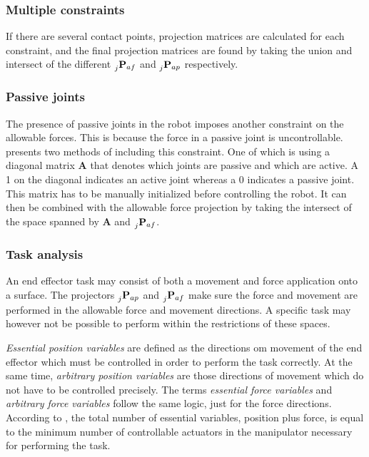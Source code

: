\subsubsection{Multiple constraints}\label{subseq:mult_contacts}

If there are several contact points, projection matrices are calculated for each constraint, and the final projection matrices are found by taking the union and intersect of the different $\prescript{}{j}{\mathbf{P}}_{af}$ and $\prescript{}{j}{\mathbf{P}}_{ap}$ respectively.

\subsubsection{Passive joints}

The presence of passive joints in the robot imposes another constraint on the allowable forces. This is because the force in a passive joint is uncontrollable. \cite{west1985method} presents two methods of including this constraint. One of which is using a diagonal matrix $\mathbf{A}$ that denotes which joints are passive and which are active. A 1 on the diagonal indicates an active joint whereas a 0 indicates a passive joint. This matrix has to be manually initialized before controlling the robot. It can then be combined with the allowable force projection by taking the intersect of the space spanned by $\mathbf{A}$ and $\prescript{}{j}{\mathbf{P}}_{af}$.

\subsubsection{Task analysis}

An end effector task may consist of both a movement and force application onto a surface. The projectors $\prescript{}{j}{\mathbf{P}}_{ap}$ and $\prescript{}{j}{\mathbf{P}}_{af}$ make sure the force and movement are performed in the allowable force and movement directions. A specific task may however not be possible to perform within the restrictions of these spaces.

\textit{Essential position variables} are defined as the directions om movement of the end effector which must be controlled in order to perform the task correctly. At the same time, \textit{arbitrary position variables} are those directions of movement which do not have to be controlled precisely. The terms \textit{essential force variables} and \textit{arbitrary force variables} follow the same logic, just for the force directions. According to \cite{west1985method}, the total number of essential variables, position plus force, is equal to the minimum number of controllable actuators in the manipulator necessary for performing the task.

